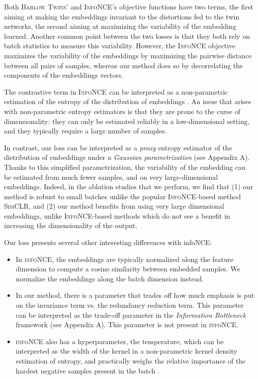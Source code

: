 \documentclass{article}
\newcommand{\AlgoName}{\textsc{Barlow Twins}}
\begin{document}
Both \AlgoName{}' and \textsc{InfoNCE}'s objective functions have two terms, the first aiming at making the embeddings invariant to the distortions fed to the twin networks, the second aiming at maximizing the variability of the embedding learned.  Another common point between the two losses is that they both rely on batch statistics to measure this variability. However, the \textsc{InfoNCE} objective maximizes the variability of the embeddings by maximizing the pairwise distance between all pairs of samples, whereas our method does so by decorrelating the components of the embeddings vectors. 

The contrastive term in \textsc{InfoNCE} can be interpreted as a non-parametric estimation of the entropy of the distribution of embeddings \cite{wang_understanding_2020}. An issue that arises with non-parametric entropy estimators is that they are prone to the curse of dimensionality: they can only be estimated reliably in a low-dimensional setting, and they typically require a large number of samples. 

In contrast, our loss can be interpreted as a \emph{proxy} entropy estimator of the distribution of embeddings under \emph{a Gaussian parametrization} (see Appendix A). Thanks to this simplified parametrization, the variability of the embedding can be estimated from much fewer samples, and on very large-dimensional embeddings. Indeed, in the ablation studies that we perform, we find that (1) our method is robust to small batches unlike the popular \textsc{InfoNCE}-based method \textsc{SimCLR}, and (2) our method benefits from using very large dimensional embeddings, unlike \textsc{InfoNCE}-based methods which do not see a benefit in increasing the dimensionality of the output.

Our loss presents several other interesting differences with infoNCE:
\begin{itemize}
\item In \textsc{infoNCE}, the embeddings are typically normalized along the feature dimension to compute a cosine similarity between embedded samples. We normalize the embeddings along the batch dimension instead.

\item In our method, there is a parameter  that trades off how much emphasis is put on the invariance term vs. the redundancy reduction term. This parameter can be interpreted as the trade-off parameter in the \emph{Information Bottleneck} framework (see Appendix A). This parameter is not present in \textsc{infoNCE}. 

\item \textsc{infoNCE} also has a hyperparameter, the temperature, which can be interpreted as the width of the kernel in a non-parametric kernel density estimation of entropy, and practically weighs the relative importance of the hardest negative samples present in the batch \cite{chen2020simple}.
\end{itemize}
\end{document}
